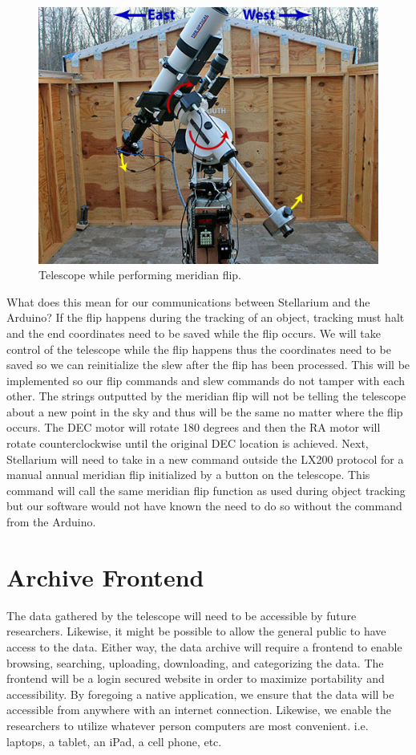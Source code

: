 \documentclass[12pt]{report}
\begin{document}
\begin{figure}[h]
  \centering
  \includegraphics[width=0.6\linewidth]{duringflip}
  \caption{Telescope while performing meridian flip.}
\end{figure}

What does this mean for our communications between Stellarium and the Arduino? If the flip happens during the tracking of an object, tracking must halt and the end coordinates need to be saved while the flip occurs. We will take control of the telescope while the flip happens thus the coordinates need to be saved so we can reinitialize the slew after the flip has been processed. This will be implemented so our flip commands and slew commands do not tamper with each other. The strings outputted by the meridian flip will not be telling the telescope about a new point in the sky and thus will be the same no matter where the flip occurs. The DEC motor will rotate 180 degrees and then the RA motor will rotate counterclockwise until the original DEC location is achieved. Next, Stellarium will need to take in a new command outside the LX200 protocol for a manual annual meridian flip initialized by a button on the telescope. This command will call the same meridian flip function as used during object tracking but our software would not have known the need to do so without the command from the Arduino.



\section*{Archive Frontend}

The data gathered by the telescope will need to be accessible by future researchers. Likewise, it might be possible to allow the general public to have access to the data. Either way, the data archive will require a frontend to enable browsing, searching, uploading, downloading, and categorizing the data. The frontend will be a login secured website in order to maximize portability and accessibility. By foregoing a native application, we ensure that the data will be accessible from anywhere with an internet connection. Likewise, we enable the researchers to utilize whatever person computers are most convenient. i.e. laptops, a tablet, an iPad, a cell phone, etc.
\end{document}
